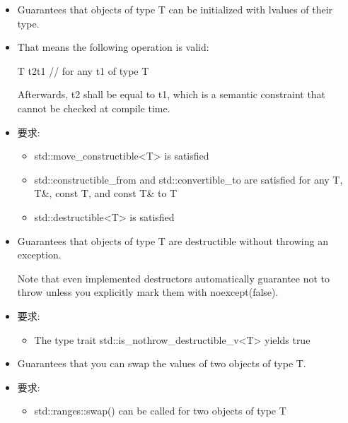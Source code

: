 
\begin{itemize}
\item
Guarantees that objects of type T can be initialized with lvalues of their type.

\item
That means the following operation is valid:

\begin{cpp}
T t2{t1} // for any t1 of type T
\end{cpp}

Afterwards, t2 shall be equal to t1, which is a semantic constraint that cannot be checked at compile time.

\item
要求:
\begin{itemize}
\item
std::move\_constructible<T> is satisfied

\item
std::constructible\_from and std::convertible\_to are satisfied for any T, T\&, const T, and const T\& to T

\item
std::destructible<T> is satisfied
\end{itemize}
\end{itemize}


\begin{itemize}
\item
Guarantees that objects of type T are destructible without throwing an exception.

Note that even implemented destructors automatically guarantee not to throw unless you explicitly mark them with noexcept(false).

\item
要求:
\begin{itemize}
\item
The type trait std::is\_nothrow\_destructible\_v<T> yields true
\end{itemize}
\end{itemize}


\begin{itemize}
\item
Guarantees that you can swap the values of two objects of type T.

\item
要求:
\begin{itemize}
\item
std::ranges::swap() can be called for two objects of type T
\end{itemize}
\end{itemize}

